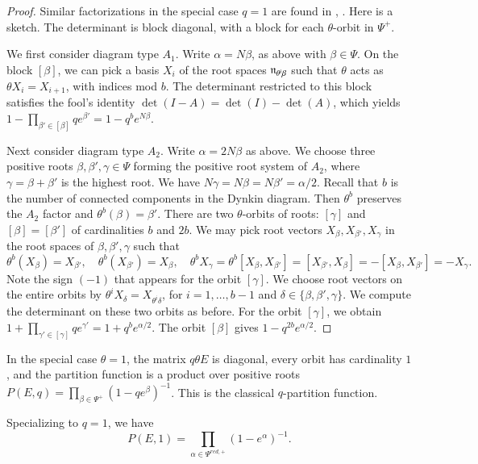 \begin{proof} Similar factorizations in the special case $q=1$ are
  found in \cite{jantzen1977darstellungen}, \cite{wendt2001weyl}.
  Here is a sketch.  The determinant is block diagonal, with a block
  for each $\theta$-orbit in $\Psi^+$.

  We first consider diagram type $A_1$.  Write $\alpha = N\beta$, as
  above with $\beta\in\Psi$.  On the block $[\beta]$, we can pick a
  basis $X_i$ of the root spaces ${\mathfrak n}_{\theta^i\beta}$ such that
  $\theta$ acts as $\theta X_i = X_{i+1}$, with indices mod $b$.  The
  determinant restricted to this block satisfies the fool's identity
  $\det(I-A) = \det(I)-\det(A)$, which yields $1- \prod_{\beta'\in
    [\beta]} {q e^{\beta'}} = 1- q^b e^{N \beta}$.

  Next consider diagram type $A_2$.  Write $\alpha = 2N\beta$ as
  above.  We choose three positive roots $\beta,\beta',\gamma\in\Psi$
  forming the positive root system of $A_2$, where
  $\gamma=\beta+\beta'$ is the highest root.  We have
  $N\gamma=N\beta=N\beta'=\alpha/2$.  Recall that $b$ is the number of
  connected components in the Dynkin diagram.  Then $\theta^b$
  preserves the $A_2$ factor and $\theta^b(\beta)=\beta'$.  There are
  two $\theta$-orbits of roots: $[\gamma]$ and $[\beta]=[\beta']$ of
  cardinalities $b$ and $2b$.  We may pick root vectors
  $X_{\beta},X_{\beta'},X_{\gamma}$ in the root spaces of
  $\beta,\beta',\gamma$ such that
\[
\theta^b(X_\beta)= X_{\beta'},\quad \theta^b(X_{\beta'})=X_\beta,\quad
\theta^b X_\gamma = \theta^b [X_\beta,X_{\beta'}] 
= [X_{\beta'},X_\beta] = -[X_\beta,X_{\beta'}] = -X_\gamma.
\]
Note the sign $(-1)$ that appears for the orbit $[\gamma]$.  We choose
root vectors on the entire orbits by $\theta^i X_\delta=X_{\theta^i
  \delta}$, for $i=1,\ldots,b-1$ and
$\delta\in\{\beta,\beta',\gamma\}$.  We compute the determinant on
these two orbits as before.  For the orbit $[\gamma]$, we obtain
$1+\prod_{\gamma'\in [\gamma]} {q e^{\gamma'}} = 1+ q^b e^{\alpha/2}$.
The orbit $[\beta]$ gives $1-q^{2b} e^{\alpha/2}$.
\end{proof}

In the special case $\theta=1$, the matrix $q \theta E$ is diagonal,
every orbit has cardinality $1$, and the partition function is a
product over positive roots $P(E,q) = \prod_{\beta\in\Psi^+} (1- q
e^\beta)^{-1}$.  This is the classical $q$-partition function.

\begin{corollary}\label{cor:prod1} 
Specializing to $q=1$, we have
\[
P(E,1) = \prod_{\alpha\in\Psi^{red,+}} (1-e^{\alpha})^{-1}.
\]
\end{corollary}

